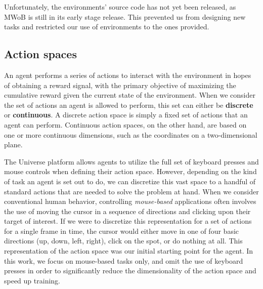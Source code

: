 \documentclass[10pt,journal,compsoc]{IEEEtran}
\begin{document}
Unfortunately, the environments' source code has not yet been released, as MWoB is still in its early stage release. This prevented us from designing new tasks and restricted our use of environments to the ones provided.

\subsection{Action spaces}
An agent performs a series of actions to interact with the environment in hopes of obtaining a reward signal, with the primary objective of maximizing the cumulative reward given the current state of the environment. When we consider the set of actions an agent is allowed to perform, this set can either be \textbf{discrete} or \textbf{continuous}. A discrete action space is simply a fixed set of actions that an agent can perform. Continuous action spaces, on the other hand, are based on one or more continuous dimensions, such as the coordinates on a two-dimensional plane. %

The Universe platform allows agents to utilize the full set of keyboard presses and mouse controls when defining their action space.
However, depending on the kind of task an agent is set out to do, we can discretize this vast space to a handful of standard actions that are needed to solve the problem at hand.
When we consider conventional human behavior, controlling \textit{mouse-based} applications often involves the use of moving the cursor in a sequence of directions and clicking upon their target of interest. If we were to discretize this representation for a set of actions for a single frame in time, the cursor would either move in one of four basic directions (up, down, left, right), click on the spot, or do nothing at all. This representation of the action space was our initial starting point for the agent. In this work, we focus on mouse-based tasks only, and omit the use of keyboard presses in order to significantly reduce the dimensionality of the action space and speed up training. %
\linebreak
\end{document}
